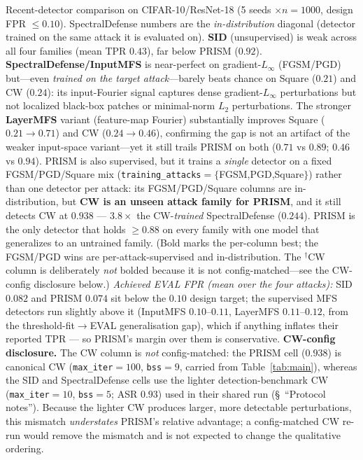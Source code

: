 \begin{table}[h]
\centering
\small

\caption{Recent-detector comparison on CIFAR-10/ResNet-18 (5 seeds
$\times n{=}1000$, design FPR $\le 0.10$). SpectralDefense numbers are the
\emph{in-distribution} diagonal (detector trained on the same attack it is
evaluated on). \textbf{SID} (unsupervised) is weak across all four families
(mean TPR $0.43$), far below PRISM ($0.92$). \textbf{SpectralDefense/InputMFS}
is near-perfect on gradient-$L_\infty$ (FGSM/PGD) but---even \emph{trained on
the target attack}---barely beats chance on Square ($0.21$) and CW ($0.24$):
its input-Fourier signal captures dense gradient-$L_\infty$ perturbations but
not localized black-box patches or minimal-norm $L_2$ perturbations. The
stronger \textbf{LayerMFS} variant (feature-map Fourier) substantially
improves Square ($0.21{\to}0.71$) and CW ($0.24{\to}0.46$), confirming the
gap is not an artifact of the weaker input-space variant---yet it still
trails PRISM on both ($0.71$ vs $0.89$; $0.46$ vs $0.94$). PRISM is also
supervised, but it trains a \emph{single} detector on a fixed FGSM/PGD/Square
mix (\texttt{training\_attacks}${=}\{$FGSM,PGD,Square$\}$) rather than one
detector per attack: its FGSM/PGD/Square columns are in-distribution, but
\textbf{CW is an unseen attack family for PRISM}, and it still detects CW at
$0.938$ --- $3.8\times$ the CW-\emph{trained} SpectralDefense ($0.244$). PRISM
is the only detector that holds $\ge 0.88$ on every family with one model that
generalizes to an untrained family. (Bold marks the per-column best; the
FGSM/PGD wins are per-attack-supervised and in-distribution. The
$^\dagger$CW column is deliberately \emph{not} bolded because it is not
config-matched---see the CW-config disclosure below.)
\emph{Achieved EVAL FPR (mean over the four attacks):} SID $0.082$ and PRISM
$0.074$ sit below the $0.10$ design target; the supervised MFS detectors run
slightly above it (InputMFS $0.10$--$0.11$, LayerMFS $0.11$--$0.12$, from the
threshold-fit$\to$EVAL generalisation gap), which if anything inflates their
reported TPR --- so PRISM's margin over them is conservative.
\textbf{CW-config disclosure.} The CW column is \emph{not} config-matched:
the PRISM cell ($0.938$) is canonical CW (\texttt{max\_iter}${=}100$,
\texttt{bss}${=}9$, carried from Table~\ref{tab:main}), whereas the SID and
SpectralDefense cells use the lighter detection-benchmark CW
(\texttt{max\_iter}${=}10$, \texttt{bss}${=}5$; ASR $0.93$) used in their
shared run (\S~``Protocol notes''). Because the lighter CW produces
larger, more detectable perturbations, this mismatch \emph{understates}
PRISM's relative advantage; a config-matched CW re-run would remove the
mismatch and is not expected to change the qualitative ordering.}
\label{tab:recent_baselines}
\end{table}

